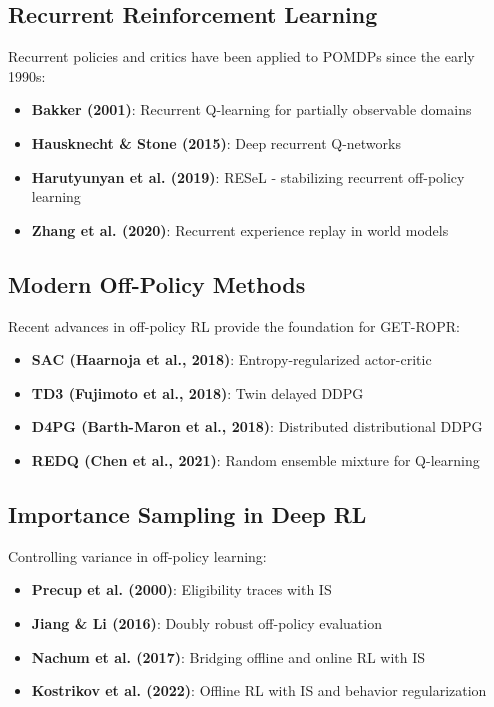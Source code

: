 \documentclass{article}
\begin{document}
\subsection{Recurrent Reinforcement Learning}
Recurrent policies and critics have been applied to POMDPs since the early 1990s:
\begin{itemize}
  \item \textbf{Bakker (2001)}: Recurrent Q-learning for partially observable domains
  \item \textbf{Hausknecht \& Stone (2015)}: Deep recurrent Q-networks
  \item \textbf{Harutyunyan et al. (2019)}: RESeL - stabilizing recurrent off-policy learning
  \item \textbf{Zhang et al. (2020)}: Recurrent experience replay in world models
\end{itemize}

\subsection{Modern Off-Policy Methods}
Recent advances in off-policy RL provide the foundation for GET-ROPR:
\begin{itemize}
  \item \textbf{SAC (Haarnoja et al., 2018)}: Entropy-regularized actor-critic
  \item \textbf{TD3 (Fujimoto et al., 2018)}: Twin delayed DDPG
  \item \textbf{D4PG (Barth-Maron et al., 2018)}: Distributed distributional DDPG
  \item \textbf{REDQ (Chen et al., 2021)}: Random ensemble mixture for Q-learning
\end{itemize}

\subsection{Importance Sampling in Deep RL}
Controlling variance in off-policy learning:
\begin{itemize}
  \item \textbf{Precup et al. (2000)}: Eligibility traces with IS
  \item \textbf{Jiang \& Li (2016)}: Doubly robust off-policy evaluation
  \item \textbf{Nachum et al. (2017)}: Bridging offline and online RL with IS
  \item \textbf{Kostrikov et al. (2022)}: Offline RL with IS and behavior regularization
\end{itemize}
\end{document}
